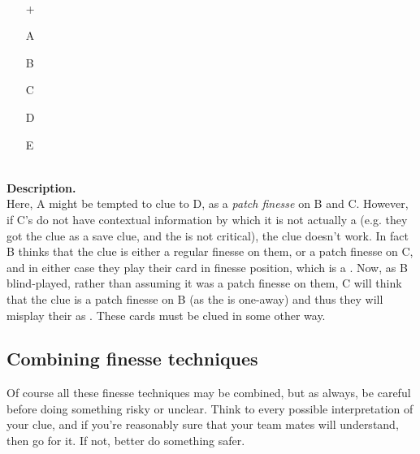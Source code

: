 \begin{example}	\hfill \\
	\begin{minipage}{0.45\textwidth}
		\begin{itemize}
			\item[\Large +]      
			\item[\Large A]    
			\item[\Large B]    
			\item[\Large C]     
			\item[\Large D]    
			\item[\Large E]    
		\end{itemize}
	\end{minipage}%
	\begin{minipage}{0.55\textwidth}
		\hfill \\
		
		\textbf{Description.} \\
		
		Here, A might be tempted to clue  to D, as a \emph{patch finesse} on B and C. However, if C's  do not have contextual information by which it is not actually a  (e.g. they got the  clue as a save clue, and the  is not critical), the clue doesn't work. In fact B thinks that the clue is either a regular finesse on them, or a patch finesse on C, and in either case they play their card in finesse position, which is a . Now, as B blind-played, rather than assuming it was a patch finesse on them, C will think that the clue is a patch finesse on B (as the  is one-away) and thus they will misplay their  as . These cards must be clued in some other way.
	\end{minipage}
\end{example} \vspace{0.15 cm}

\subsection{Combining finesse techniques}

Of course all these finesse techniques may be combined, but as always, be careful before doing something risky or unclear. Think to every possible interpretation of your clue, and if you're reasonably sure that your team mates will understand, then go for it. If not, better do something safer.